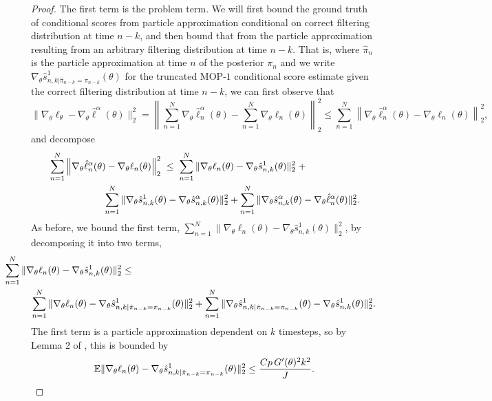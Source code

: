 \begin{proof}
The first term is the problem term. We will first bound the ground truth of conditional scores from particle approximation conditional on correct filtering distribution at time $n-k$, and then bound that from the particle approximation resulting from an arbitrary filtering distribution at time $n-k$. That is, where $\hat\pi_n$ is the particle approximation at time $n$ of the posterior $\pi_n$ and we write $\nabla_\theta\hat s_{n,k|\hat\pi_{n-k}=\pi_{n-k}}^1(\theta)$ for the truncated MOP-$1$ conditional score estimate given the correct filtering distribution at time $n-k$, we can first observe that
\begin{equation}
    \big\|\nabla_\theta\ell_\theta - \nabla_\theta \hat\ell^\alpha(\theta)\big\|_2^2 =  \left\lVert\sum_{n=1}^N \nabla_\theta \hat\ell_n^\alpha(\theta) - \sum_{n=1}^N \nabla_\theta \ell_n(\theta)\right\rVert_2^2 \leq \sum_{n=1}^N\left\lVert \nabla_\theta \hat\ell_n^\alpha(\theta) -  \nabla_\theta \ell_n(\theta)\right\rVert_2^2,
\end{equation}
and decompose
\begin{align} \nonumber
    & \sum_{n=1}^N\left\lVert \nabla_\theta \hat\ell_n^\alpha(\theta) -  \nabla_\theta \ell_n(\theta)\right\rVert_2^2 \; \leq  \; \sum_{n=1}^N\|\nabla_\theta\ell_n(\theta) - \nabla_\theta\hat s_{n,k}^1(\theta)\|_2^2  \; +
     \\ & \hspace{20mm}
     \sum_{n=1}^N\|\nabla_\theta\hat s_{n,k}^1(\theta) - \nabla_\theta\hat s_{n,k}^\alpha(\theta)\|_2^2 + \sum_{n=1}^N\|\nabla_\theta\hat s_{n,k}^\alpha(\theta) -  \nabla_\theta\hat\ell_n^\alpha(\theta)\|_2^2.
\end{align}
As before, we bound the first term, $\sum_{n=1}^N\|\nabla_\theta\ell_n(\theta) - \nabla_\theta\hat s_{n,k}^1(\theta)\|_2^2$, by decomposing it into two terms, 
\begin{eqnarray}
\nonumber
\hspace{-10mm} \sum_{n=1}^N\|\nabla_\theta\ell_n(\theta) - \nabla_\theta\hat s_{n,k}^1(\theta)\|_2^2 &\leq&
\\
&& \hspace{-40mm}
\sum_{n=1}^N \|\nabla_\theta\ell_n(\theta) - \nabla_\theta\hat s_{n,k|\hat\pi_{n-k}=\pi_{n-k}}^1(\theta)\|_2^2 + \sum_{n=1}^N \|\nabla_\theta\hat s_{n,k|\hat\pi_{n-k}=\pi_{n-k}}^1(\theta) - \nabla_\theta\hat s_{n,k}^1(\theta)\|_2^2.
\end{eqnarray}
The first term is a particle approximation dependent on $k$ timesteps, so by Lemma 2 of \cite{karjalainen23}, this is bounded by
\begin{equation}\mathbb{E}\|\nabla_\theta\ell_n(\theta) - \nabla_\theta\hat s_{n,k|\hat\pi_{n-k}=\pi_{n-k}}^1(\theta)\|_2^2 \leq \frac{Cp \, G'(\theta)^2k^2}{J}.\end{equation}


\end{proof}
